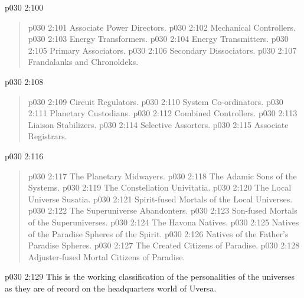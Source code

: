 \vsetspace
\vs p030 2:100 \bibnobreakspace {}
\begin{quote}
\vs p030 2:101 \bibnobreakspace Associate Power Directors.
\vs p030 2:102 \bibnobreakspace Mechanical Controllers.
\vs p030 2:103 \bibnobreakspace Energy Transformers.
\vs p030 2:104 \bibnobreakspace Energy Transmitters.
\vs p030 2:105 \bibnobreakspace Primary Associators.
\vs p030 2:106 \bibnobreakspace Secondary Dissociators.
\vs p030 2:107 \bibnobreakspace Frandalanks and Chronoldeks.
\end{quote}
\vsetspace
\vs p030 2:108 \bibnobreakspace {}
\begin{quote}
\vs p030 2:109 \bibnobreakspace Circuit Regulators.
\vs p030 2:110 \bibnobreakspace System Co\hyp{}ordinators.
\vs p030 2:111 \bibnobreakspace Planetary Custodians.
\vs p030 2:112 \bibnobreakspace Combined Controllers.
\vs p030 2:113 \bibnobreakspace Liaison Stabilizers.
\vs p030 2:114 \bibnobreakspace Selective Assorters.
\vs p030 2:115 \bibnobreakspace Associate Registrars.
\end{quote}
\vsetspace
\vs p030 2:116 \bibnobreakspace {}
\begin{quote}
\vs p030 2:117 \bibnobreakspace The Planetary Midwayers.
\vs p030 2:118 \bibnobreakspace The Adamic Sons of the Systems.
\vs p030 2:119 \bibnobreakspace The Constellation Univitatia.
\vs p030 2:120 \bibnobreakspace The Local Universe Susatia.
\vs p030 2:121 \bibnobreakspace Spirit\hyp{}fused Mortals of the Local Universes.
\vs p030 2:122 \bibnobreakspace The Superuniverse Abandonters.
\vs p030 2:123 \bibnobreakspace Son\hyp{}fused Mortals of the Superuniverses.
\vs p030 2:124 \bibnobreakspace The Havona Natives.
\vs p030 2:125 \bibnobreakspace Natives of the Paradise Spheres of the Spirit.
\vs p030 2:126 \bibnobreakspace Natives of the Father’s Paradise Spheres.
\vs p030 2:127 \bibnobreakspace The Created Citizens of Paradise.
\vs p030 2:128 \bibnobreakspace Adjuster\hyp{}fused Mortal Citizens of Paradise.
\end{quote}
\vs p030 2:129 \pc This is the working classification of the personalities of the universes as they are of record on the headquarters world of Uversa.
